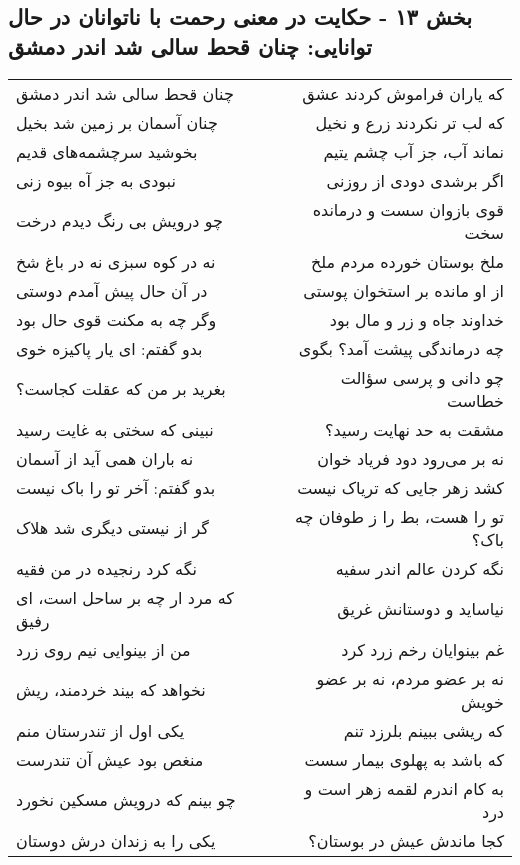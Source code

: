 \begin{center}
\section*{بخش ۱۳ - حکایت در معنی رحمت با ناتوانان در حال توانایی: چنان قحط سالی شد اندر دمشق}
\label{sec:013}
\begin{longtable}{l p{0.5cm} r}
چنان قحط سالی شد اندر دمشق
&&
که یاران فراموش کردند عشق
\\
چنان آسمان بر زمین شد بخیل
&&
که لب تر نکردند زرع و نخیل
\\
بخوشید سرچشمه‌های قدیم
&&
نماند آب، جز آب چشم یتیم
\\
نبودی به جز آه بیوه زنی
&&
اگر برشدی دودی از روزنی
\\
چو درویش بی رنگ دیدم درخت
&&
قوی بازوان سست و درمانده سخت
\\
نه در کوه سبزی نه در باغ شخ
&&
ملخ بوستان خورده مردم ملخ
\\
در آن حال پیش آمدم دوستی
&&
از او مانده بر استخوان پوستی
\\
وگر چه به مکنت قوی حال بود
&&
خداوند جاه و زر و مال بود
\\
بدو گفتم: ای یار پاکیزه خوی
&&
چه درماندگی پیشت آمد؟ بگوی
\\
بغرید بر من که عقلت کجاست؟
&&
چو دانی و پرسی سؤالت خطاست
\\
نبینی که سختی به غایت رسید
&&
مشقت به حد نهایت رسید؟
\\
نه باران همی آید از آسمان
&&
نه بر می‌رود دود فریاد خوان
\\
بدو گفتم: آخر تو را باک نیست
&&
کشد زهر جایی که تریاک نیست
\\
گر از نیستی دیگری شد هلاک
&&
تو را هست، بط را ز طوفان چه باک؟
\\
نگه کرد رنجیده در من فقیه
&&
نگه کردن عالم اندر سفیه
\\
که مرد ار چه بر ساحل است، ای رفیق
&&
نیاساید و دوستانش غریق
\\
من از بینوایی نیم روی زرد
&&
غم بینوایان رخم زرد کرد
\\
نخواهد که بیند خردمند، ریش
&&
نه بر عضو مردم، نه بر عضو خویش
\\
یکی اول از تندرستان منم
&&
که ریشی ببینم بلرزد تنم
\\
منغص بود عیش آن تندرست
&&
که باشد به پهلوی بیمار سست
\\
چو بینم که درویش مسکین نخورد
&&
به کام اندرم لقمه زهر است و درد
\\
یکی را به زندان درش دوستان
&&
کجا ماندش عیش در بوستان؟
\\
\end{longtable}
\end{center}
